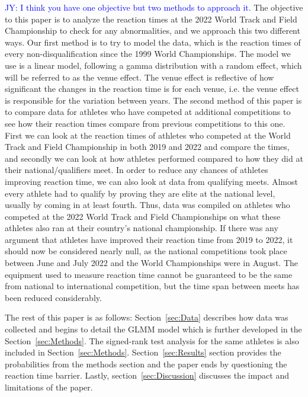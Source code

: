 \documentclass[12pt, letterpaper, titlepage]{article}
\newcommand{\jy}[1]{\textcolor{blue}{JY: #1}}
\begin{document}

\jy{I think you have one objective but two methods to approach it.}
The objective to this paper is to analyze the reaction times at the 2022
World Track and Field Championship to check for any abnormalities, and we approach
this two different ways.  Our first method is to try to model the data, which is
the reaction times of every non-disqualification since the 1999 World Championships. 
The model we use is a linear model, following a gamma distribution with a random
effect, which will be referred to as the venue effect.  The venue effect is
reflective of how significant the changes in the reaction time is for each venue,
i.e. the venue effect is  responsible for the variation between years.  
The second method of this paper is to compare data for athletes who have competed
at additional competitions to see how their reaction times compare from previous
competitions to this one. First we can look at the reaction times of athletes who
competed at the World Track and Field Championship in both 2019 and 2022 and
compare the times, and secondly we can look at how athletes performed compared
to how they did at their national/qualifiers meet. In order to reduce any chances
of athletes improving reaction time, we can also look at data from qualifying meets.
Almost every athlete had to qualify by proving they are elite at the national level, 
usually by coming in at least fourth. Thus, data was compiled on athletes who competed
at the 2022 World Track and Field Championships on what these athletes also ran 
at their country's national championship. If there was any argument that athletes
have improved their reaction time from 2019 to 2022, it should now be considered
nearly null, as the national competitions took place between June and July 2022 
and the World Championships were in August. The equipment used to measure reaction
time cannot be guaranteed to be the same from national to international
competition, but the time span between meets has been reduced considerably.


The rest of this paper is as follows: Section~\ref{sec:Data} describes how data was
collected and begins to detail the GLMM model which is further developed in the
Section~\ref{sec:Methods}.  The signed-rank test analysis for the same athletes is
also included in Section~\ref{sec:Methods}.  Section~\ref{sec:Results}
section provides the probabilities from the methods section and the paper ends 
by questioning the reaction time barrier.  Lastly, section~\ref{sec:Discussion}
discusses the impact and limitations of the paper.
\end{document}

